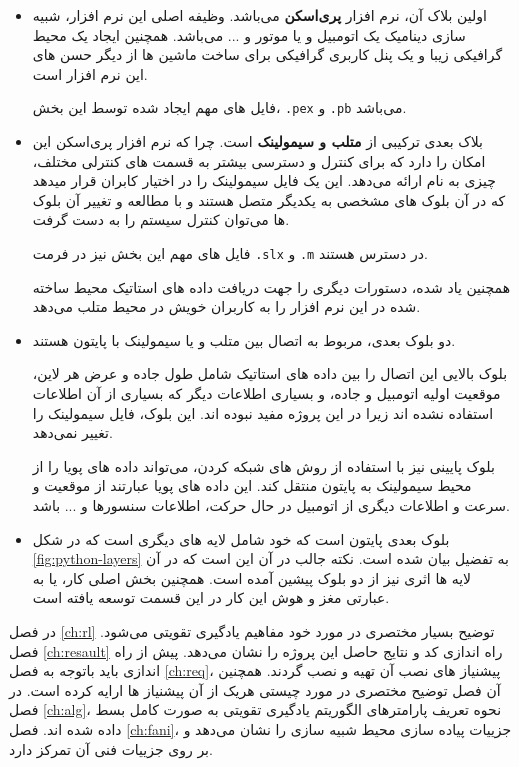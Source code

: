 \begin{itemize}
	\item 
	اولین بلاک آن، نرم افزار \textbf{پری‌اسکن }می‌باشد. وظیفه اصلی این نرم افزار، شبیه سازی دینامیک یک اتومبیل و یا موتور و ... می‌باشد. همچنین ایجاد یک محیط گرافیکی زیبا و یک پنل کاربری گرافیکی برای ساخت ماشین ها از دیگر حسن های این نرم افزار است.
	
	فایل های مهم ایجاد شده توسط این بخش، \texttt{.pex} و \texttt{.pb} می‌باشد.
	
	\item
	بلاک بعدی ترکیبی از \textbf{متلب و سیمولینک }است. چرا که نرم افزار پری‌اسکن این امکان را دارد که برای کنترل و دسترسی بیشتر به قسمت های کنترلی مختلف، چیزی به نام  ارائه می‌دهد. این  یک فایل سیمولینک را در اختیار کابران قرار میدهد که در آن بلوک های مشخصی به یکدیگر متصل هستند و با مطالعه و تغییر آن بلوک ها می‌توان کنترل سیستم را به دست گرفت.
	
	فایل های مهم این بخش نیز در فرمت \texttt{.slx} و \texttt{.m} در دسترس هستند.
	
	همچنین  یاد شده، دستورات دیگری را جهت دریافت داده های استاتیک محیط ساخته شده در این نرم افزار را به کاربران خویش در محیط متلب می‌دهد.
	
	\item
	دو بلوک بعدی، مربوط به اتصال بین متلب و یا سیمولینک با پایتون هستند. 
	
	بلوک بالایی این اتصال را بین داده های استاتیک شامل طول جاده و عرض هر لاین، موقعیت اولیه اتومبیل و جاده، و بسیاری اطلاعات دیگر که بسیاری از آن اطلاعات استفاده نشده اند زیرا در این پروژه مفید نبوده اند. این بلوک، فایل سیمولینک را تغییر نمی‌دهد.
	
	بلوک پایینی نیز با استفاده از روش های شبکه کردن، می‌تواند داده های پویا را از محیط سیمولینک به پایتون منتقل کند. این داده های پویا عبارتند از موقعیت و سرعت و اطلاعات دیگری از اتومبیل در حال حرکت، اطلاعات سنسورها و ... باشد.
	
	\item 
	بلوک بعدی پایتون است که خود شامل لایه های دیگری است که در شکل 
	\ref{fig:python-layers}
	به تفضیل بیان شده است. نکته جالب در آن این است که در آن لایه ها اثری نیز از دو بلوک پیشین آمده است. همچنین بخش اصلی کار، یا به عبارتی مغز و هوش این کار در این قسمت توسعه یافته است.
\end{itemize}





در فصل \ref{ch:rl} توضیح بسیار مختصری در مورد خود مفاهیم یادگیری تقویتی می‌شود. فصل \ref{ch:resault} راه اندازی کد و نتایج حاصل این پروژه را نشان می‌دهد. پیش از راه اندازی باید باتوجه به فصل \ref{ch:req}، پیشنیاز های نصب آن تهیه و نصب گردند. همچنین آن فصل توضیح مختصری در مورد چیستی هریک از آن پیشنیاز ها ارایه کرده است. در فصل \ref{ch:alg}، نحوه تعریف پارامترهای الگوریتم یادگیری تقویتی به صورت کامل بسط داده شده اند. فصل \ref{ch:fani}، جزییات پیاده سازی محیط شبیه سازی را نشان می‌دهد و بر روی جزییات فنی آن تمرکز دارد.










